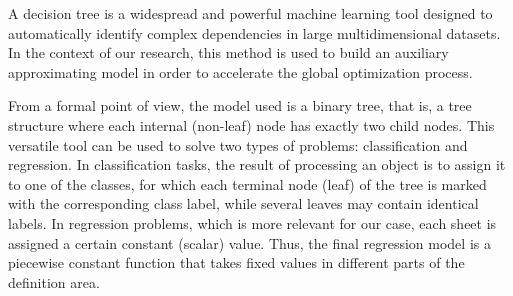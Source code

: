 \documentclass[runningheads]{llncs}
\begin{document}




A decision tree is a widespread and powerful machine learning tool designed to automatically identify complex dependencies in large multidimensional datasets. In the context of our research, this method is used to build an auxiliary approximating model in order to accelerate the global optimization process.

From a formal point of view, the model used is a binary tree, that is, a tree structure where each internal (non-leaf) node has exactly two child nodes. This versatile tool can be used to solve two types of problems: classification and regression. In classification tasks, the result of processing an object is to assign it to one of the classes, for which each terminal node (leaf) of the tree is marked with the corresponding class label, while several leaves may contain identical labels. In regression problems, which is more relevant for our case, each sheet is assigned a certain constant (scalar) value. Thus, the final regression model is a piecewise constant function that takes fixed values in different parts of the definition area.
\end{document}
